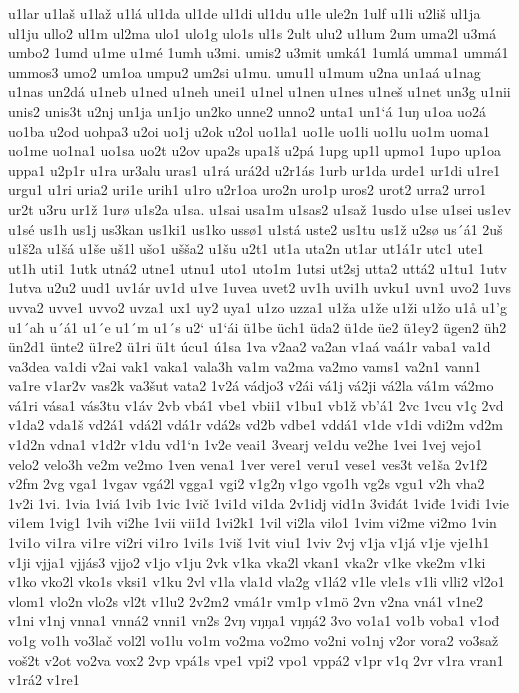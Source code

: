 u1lar
u1laš
u1laž
u1lá
ul1da
ul1de
ul1di
ul1du
u1le
ule2n
1ulf
u1li
u2liš
ul1ja
ul1ju
ullo2
ul1m
ul2ma
ulo1
ulo1g
ulo1s
ul1s
2ult
ulu2
u1lum
2um
uma2l
u3má
umbo2
1umd
u1me
u1mé
1umh
u3mi.
umis2
u3mit
umká1
1umlá
umma1
ummá1
ummos3
umo2
um1oa
umpu2
um2si
u1mu.
umu1l
u1mum
u2na
un1aá
u1nag
u1nas
un2dá
u1neb
u1ned
u1neh
unei1
u1nel
u1nen
u1nes
u1neš
u1net
un3g
u1nii
unis2
unis3t
u2nj
un1ja
un1jo
un2ko
unne2
unno2
unta1
un1`á
1uŋ
u1oa
uo2á
uo1ba
u2od
uohpa3
u2oi
uo1j
u2ok
u2ol
uo1la1
uo1le
uo1li
uo1lu
uo1m
uoma1
uo1me
uo1na1
uo1sa
uo2t
u2ov
upa2s
upa1š
u2pá
1upg
up1l
upmo1
1upo
up1oa
uppa1
u2p1r
u1ra
ur3alu
uras1
u1rá
urá2d
u2r1ás
1urb
ur1da
urde1
ur1di
u1re1
urgu1
u1ri
uria2
uri1e
urih1
u1ro
u2r1oa
uro2n
uro1p
uros2
urot2
urra2
urro1
ur2t
u3ru
ur1ž
1urø
u1s2a
u1sa.
u1sai
usa1m
u1sas2
u1saž
1usdo
u1se
u1sei
us1ev
u1sé
us1h
us1j
us3kan
us1ki1
us1ko
ussø1
u1stá
uste2
us1tu
us1ž
u2sø
us´á1
2uš
u1š2a
u1šá
u1še
uš1l
ušo1
ušša2
u1šu
u2t1
ut1a
uta2n
ut1ar
ut1á1r
utc1
ute1
ut1h
uti1
1utk
utná2
utne1
utnu1
uto1
uto1m
1utsi
ut2sj
utta2
uttá2
u1tu1
1utv
1utva
u2u2
uud1
uv1ár
uv1d
u1ve
1uvea
uvet2
uv1h
uvi1h
uvku1
uvn1
uvo2
1uvs
uvva2
uvve1
uvvo2
uvza1
ux1
uy2
uya1
u1zo
uzza1
u1ža
u1že
u1ži
u1žo
u1å
u1'g
u1´ah
u´á1
u1´e
u1´m
u1´s
u2`
u1`ái
ü1be
üch1
üda2
ü1de
üe2
ü1ey2
ügen2
üh2
ün2d1
ünte2
ü1re2
ü1ri
ü1t
úcu1
ú1sa
1va
v2aa2
va2an
v1aá
vaá1r
vaba1
va1d
va3dea
va1di
v2ai
vak1
vaka1
vala3h
va1m
va2ma
va2mo
vams1
va2n1
vann1
va1re
v1ar2v
vas2k
va3šut
vata2
1v2á
vádjo3
v2ái
vá1j
vá2ji
vá2la
vá1m
vá2mo
vá1ri
vása1
vás3tu
v1áv
2vb
vbá1
vbe1
vbii1
v1bu1
vb1ž
vb'á1
2vc
1vcu
v1ç
2vd
v1da2
vda1š
vd2á1
vdá2l
vdá1r
vdá2s
vd2b
vdbe1
vddá1
v1de
v1di
vdi2m
vd2m
v1d2n
vdna1
v1d2r
v1du
vd1`n
1v2e
veai1
3vearj
ve1du
ve2he
1vei
1vej
vejo1
velo2
velo3h
ve2m
ve2mo
1ven
vena1
1ver
vere1
veru1
vese1
ves3t
ve1ša
2v1f2
v2fm
2vg
vga1
1vgav
vgá2l
vgga1
vgi2
v1g2ŋ
v1go
vgo1h
vg2s
vgu1
v2h
vha2
1v2i
1vi.
1via
1viá
1vib
1vic
1vič
1vi1d
vi1da
2v1idj
vid1n
3viđát
1viđe
1viđi
1vie
vi1em
1vig1
1vih
vi2he
1vii
vii1d
1vi2k1
1vil
vi2la
vilo1
1vim
vi2me
vi2mo
1vin
1vi1o
vi1ra
vi1re
vi2ri
vi1ro
1vi1s
1viš
1vit
viu1
1viv
2vj
v1ja
v1já
v1je
vje1h1
v1ji
vjja1
vjjás3
vjjo2
v1jo
v1ju
2vk
v1ka
vka2l
vkan1
vka2r
v1ke
vke2m
v1ki
v1ko
vko2l
vko1s
vksi1
v1ku
2vl
v1la
vla1d
vla2g
v1lá2
v1le
vle1s
v1li
vlli2
vl2o1
vlom1
vlo2n
vlo2s
vl2t
v1lu2
2v2m2
vmá1r
vm1p
v1mö
2vn
v2na
vná1
v1ne2
v1ni
v1nj
vnna1
vnná2
vnni1
vn2s
2vŋ
vŋŋa1
vŋŋá2
3vo
vo1a1
vo1b
voba1
v1ođ
vo1g
vo1h
vo3lač
vol2l
vo1lu
vo1m
vo2ma
vo2mo
vo2ni
vo1nj
v2or
vora2
vo3saž
voš2t
v2ot
vo2va
vox2
2vp
vpá1s
vpe1
vpi2
vpo1
vppá2
v1pr
v1q
2vr
v1ra
vran1
v1rá2
v1re1
